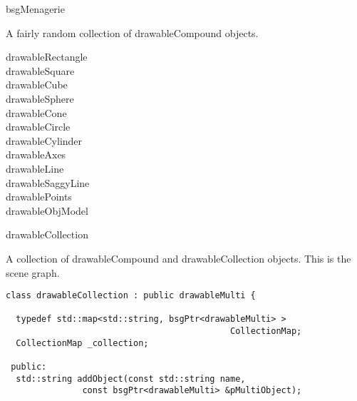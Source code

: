 \documentclass[12pt]{article}
\begin{document}
\begin{frame}{bsgMenagerie}
  \begin{center}
    A fairly random collection of drawableCompound objects.

\vspace{10pt}

    \begin{minipage}{0.8\columnwidth}
      \begin{multicols}{2}
        \begin{description}
        \item[drawableRectangle]
        \item[drawableSquare]
        \item[drawableCube]
        \item[drawableSphere]
        \item[drawableCone]
        \item[drawableCircle]
        \item[drawableCylinder]
        \item[drawableAxes]
        \item[drawableLine]
        \item[drawableSaggyLine]
        \item[drawablePoints]
        \item[drawableObjModel]
        \end{description}
      \end{multicols}
    \end{minipage}
  \end{center}
\end{frame}

\begin{frame}[fragile]{drawableCollection}

A collection of drawableCompound and drawableCollection objects.  This
is the scene graph.

\begin{verbatim}
class drawableCollection : public drawableMulti {

  typedef std::map<std::string, bsgPtr<drawableMulti> >
                                            CollectionMap;
  CollectionMap _collection;

 public:
  std::string addObject(const std::string name,
               const bsgPtr<drawableMulti> &pMultiObject);
\end{verbatim}
\end{frame}
\end{document}
